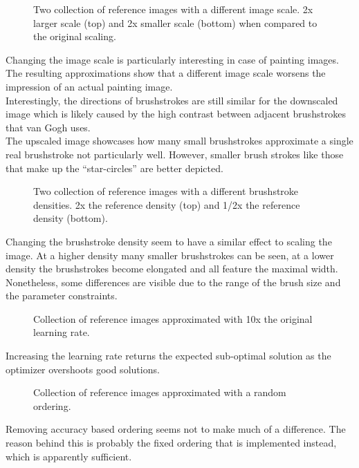 \begin{figure*}
    \caption[]{Two collection of reference images with a different image scale. 2x larger scale (top) and 2x smaller scale (bottom) when compared to the original scaling.}
\end{figure*}
Changing the image scale is particularly interesting in case of painting images.
The resulting approximations show that a different image scale worsens the impression of an actual painting image.\\
Interestingly, the directions of brushstrokes are still similar for the downscaled image which is likely caused by the high contrast between adjacent brushstrokes that van Gogh uses.\\
The upscaled image showcases how many small brushstrokes approximate a single real brushstroke not particularly well.
However, smaller brush strokes like those that make up the ``star-circles'' are better depicted.

\begin{figure*}
    \caption[]{Two collection of reference images with a different brushstroke densities. 2x the reference density (top) and 1/2x the reference density (bottom).}
\end{figure*}
Changing the brushstroke density seem to have a similar effect to scaling the image.
At a higher density many smaller brushstrokes can be seen, at a lower density the brushstrokes become elongated and all feature the maximal width.
Nonetheless, some differences are visible due to the range of the brush size and the parameter constraints.

\begin{figure*}
    \caption[]{Collection of reference images approximated with 10x the original learning rate.}
\end{figure*}
Increasing the learning rate returns the expected sub-optimal solution as the optimizer overshoots good solutions. 

\begin{figure*}
    \caption[]{Collection of reference images approximated with a random ordering.}
\end{figure*}
Removing accuracy based ordering seems not to make much of a difference.
The reason behind this is probably the fixed ordering that is implemented instead, which is apparently sufficient.

